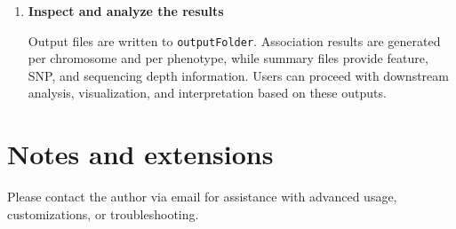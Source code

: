 \documentclass[11pt]{article}
\begin{document}
\begin{enumerate}
\begin{itemize}
    \item \texttt{step2.sbatch} \\
    Performs single-variant association testing using the fitted null models 
    and SNP genotypes.
    This step supports chromosome-wise execution via the \texttt{chrom} parameter
    in \texttt{config.sh}.
    We encourage users to run step 2 separately for different chromosomes 
    (e.g. \texttt{chrom=1},
    \texttt{chrom=2}, \ldots), enabling straightforward parallelization on
    high-performance computing systems.
  \end{itemize}


  \item \textbf{Inspect and analyze the results}

  Output files are written to \texttt{outputFolder}.
  Association results are generated per chromosome and per phenotype, while
  summary files provide feature, SNP, and sequencing depth information.
  Users can proceed with downstream analysis, visualization, and interpretation
  based on these outputs.
\end{enumerate}


\section{Notes and extensions}

Please contact the author via email for assistance with advanced usage, customizations,
or troubleshooting.
\end{document}

